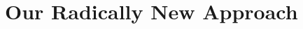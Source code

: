 \documentclass[english,smartquotes]{hgbarticle}
\begin{document}
\lipsum[2-4]


\section{Our Radically New Approach}

\lipsum[5-7]



\printbibliography %

\end{document}

